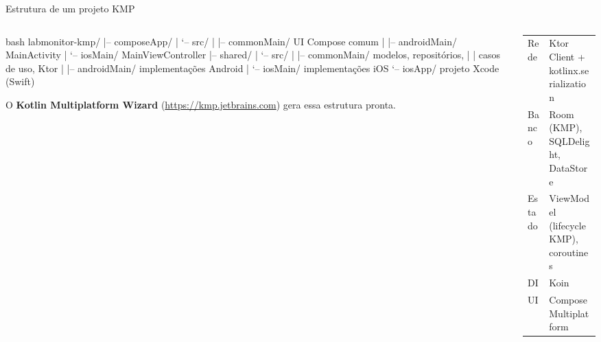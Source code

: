 \documentclass[aspectratio=169,10pt]{beamer}
\begin{document}
\begin{frame}[fragile]{Estrutura de um projeto KMP}
  \begin{columns}[T]
    \begin{column}{0.46\textwidth}
\begin{codigo}[title=Projeto KMP]{bash}
labmonitor-kmp/
|-- composeApp/
|   `-- src/
|       |-- commonMain/   UI Compose comum
|       |-- androidMain/  MainActivity
|       `-- iosMain/      MainViewController
|-- shared/
|   `-- src/
|       |-- commonMain/   modelos, repositórios,
|       |                 casos de uso, Ktor
|       |-- androidMain/  implementações Android
|       `-- iosMain/      implementações iOS
`-- iosApp/               projeto Xcode (Swift)
\end{codigo}
      \begin{dica}
        O \textbf{Kotlin Multiplatform Wizard} (\url{https://kmp.jetbrains.com}) gera essa estrutura pronta.
      \end{dica}
    \end{column}
    \begin{column}{0.52\textwidth}
      \centering
      \scriptsize
      \begin{tabularx}{\linewidth}{@{}l L@{}}
        \toprule
         &  \\
        \midrule
        Rede & Ktor Client + kotlinx.serialization \\
        Banco & Room (KMP), SQLDelight, DataStore \\
        Estado & ViewModel (lifecycle KMP), coroutines \\
        DI & Koin \\
        UI & Compose Multiplatform \\
        \bottomrule
      \end{tabularx}
    \end{column}
  \end{columns}
\end{frame}
\end{document}
